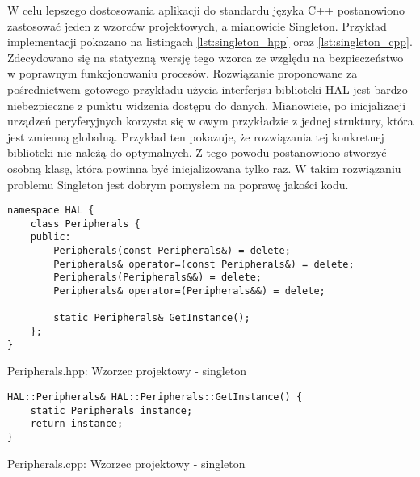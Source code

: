 W celu lepszego dostosowania aplikacji do standardu języka C++ postanowiono zastosować jeden z wzorców
projektowych, a mianowicie Singleton. Przykład implementacji pokazano na listingach \ref{lst:singleton_hpp}
oraz \ref{lst:singleton_cpp}. Zdecydowano się na statyczną wersję tego wzorca ze względu na bezpieczeństwo
w poprawnym funkcjonowaniu procesów. Rozwiązanie proponowane za pośrednictwem gotowego przykładu użycia
interferjsu biblioteki HAL jest bardzo niebezpieczne z punktu widzenia dostępu do danych. Mianowicie, po
inicjalizacji urządzeń peryferyjnych korzysta się w owym przykładzie z jednej struktury, która jest zmienną
globalną. Przykład ten pokazuje, że rozwiązania tej konkretnej biblioteki nie należą do optymalnych.
Z tego powodu postanowiono stworzyć osobną klasę, która powinna być inicjalizowana tylko raz. W takim
rozwiązaniu problemu Singleton jest dobrym pomysłem na poprawę jakości kodu.

\begin{listing}[htb]
\begin{verbatim}
namespace HAL {
    class Peripherals {
    public:
        Peripherals(const Peripherals&) = delete;
        Peripherals& operator=(const Peripherals&) = delete;
        Peripherals(Peripherals&&) = delete;
        Peripherals& operator=(Peripherals&&) = delete;

        static Peripherals& GetInstance();
    };
}
\end{verbatim}
\caption{Peripherals.hpp: Wzorzec projektowy - singleton}
\label{lst:singleton_hpp}
\end{listing}

\begin{listing}[htb]
\begin{verbatim}
HAL::Peripherals& HAL::Peripherals::GetInstance() {
    static Peripherals instance;
    return instance;
}
\end{verbatim}
\caption{Peripherals.cpp: Wzorzec projektowy - singleton}
\label{lst:singleton_cpp}
\end{listing}

